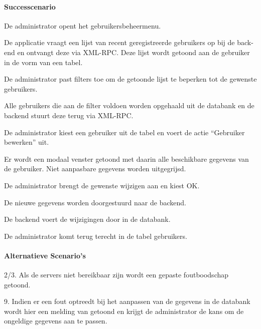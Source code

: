 \begin{compact}
\paragraph{Successcenario}
\begin{enumerate_compact}
 \item De administrator opent het gebruikersbeheermenu.
 \item De applicatie vraagt een lijst van recent geregistreerde gebruikers op bij de back-end en ontvangt deze via XML-RPC. Deze lijst wordt getoond aan de gebruiker in de vorm van een tabel.
 \item De administrator past filters toe om de getoonde lijst te beperken tot de gewenste gebruikers.
 \item Alle gebruikers die aan de filter voldoen worden opgehaald uit de databank en de backend stuurt deze terug via XML-RPC.
 \item De administrator kiest een gebruiker uit de tabel en voert de actie ``Gebruiker bewerken'' uit.
 \item Er wordt een modaal venster getoond met daarin alle beschikbare gegevens van de gebruiker. Niet aanpasbare gegevens worden uitgegrijsd.
 \item De administrator brengt de gewenste wijzigen aan en kiest OK.
 \item De nieuwe gegevens worden doorgestuurd naar de backend.
 \item De backend voert de wijzigingen door in de databank.
 \item De administrator komt terug terecht in de tabel gebruikers.
\end{enumerate_compact}
\paragraph{Alternatieve Scenario's}
\begin{enumerate_compact}
	\item[2/3.] Als de servers niet bereikbaar zijn wordt een gepaste foutboodschap getoond.
	\item[9.] Indien er een fout optreedt bij het aanpassen van de gegevens in de databank wordt hier een melding van getoond en krijgt de administrator de kans om de ongeldige gegevens aan te passen.
\end{enumerate_compact}
\end{compact}

